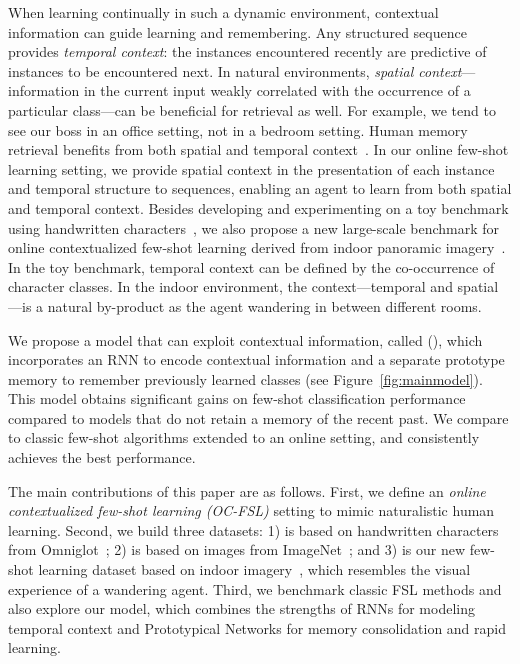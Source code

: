 When learning continually in such a dynamic environment, contextual information can guide learning
and remembering. Any structured sequence provides \emph{temporal context}: the instances encountered
recently are predictive of instances to be encountered next. In natural environments, \emph{spatial
context}---information in the current input weakly correlated with the occurrence of a particular
class---can be beneficial for retrieval as well. For example, we tend to see our  boss in an office
setting, not in a bedroom setting. Human memory retrieval benefits from both  spatial and temporal
context~\citep{Howard2017, foundationsmemory}. In our online few-shot learning setting, we provide
spatial context in the presentation of each instance and temporal structure to sequences, enabling
an agent to learn from both spatial and temporal context. Besides developing and experimenting on a
toy benchmark using handwritten characters~\citep{omniglot}, we also propose a new large-scale
benchmark for online contextualized few-shot learning derived from indoor panoramic
imagery~\citep{matterport}. In the toy benchmark, temporal context can be defined by the
co-occurrence of character classes. In the indoor environment, the context---temporal and
spatial---is a natural by-product as the agent wandering in between different rooms.

We propose a model that can exploit contextual information, called \emph{\ourmodel{}}
(\emph{\ourmodelshort{}}), which incorporates an RNN to encode contextual information and a separate
prototype memory to remember previously learned classes (see Figure~\ref{fig:mainmodel}). This model
obtains significant gains on few-shot classification performance compared to models that do not
retain a memory of the recent past. We compare to classic few-shot algorithms extended to an online
setting, and
\ourmodelshort{} consistently achieves the best performance.

The main contributions of this paper are as follows. First, we define an \emph{online contextualized
few-shot learning (OC-FSL)} setting to mimic naturalistic human learning. Second, we build three
datasets: 1) {\it \ourchar{}} is based on handwritten characters from
Omniglot~\citep{omniglot}; 2) {\it \ourimg{}} is based on images from ImageNet~\citep{imagenet}; and 3) {\it \ourroom{}} is our new few-shot learning dataset
based on indoor imagery~\citep{matterport}, which resembles the visual experience of a wandering
agent. Third, we benchmark classic FSL methods and also explore our \ourmodelshort{} model, which
combines the strengths of RNNs for modeling temporal context and Prototypical Networks
\citep{protonet} for memory consolidation  and rapid learning.